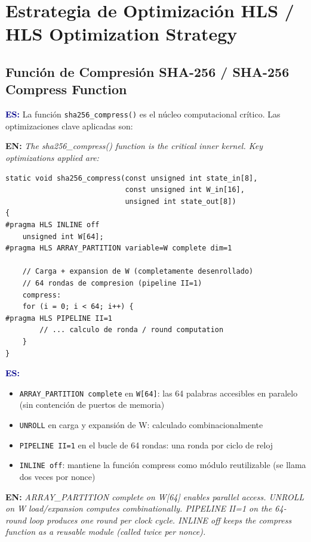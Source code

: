 \documentclass[12pt,a4paper]{article}
\newcommand{\bsection}[2]{%
    \section{#1 \textnormal{\normalsize\color{accentblue}/ #2}}%
}
\newcommand{\bsubsection}[2]{%
    \subsection{#1 \textnormal{\small\color{accentblue}/ #2}}%
}
\newenvironment{bilingual}{%
    \par\medskip
}{%
    \par\medskip
}
\newcommand{\espara}[1]{\noindent\textcolor{darkblue}{\textbf{ES:}} #1\par\smallskip}
\newcommand{\enpara}[1]{\noindent\textcolor{accentblue}{\textbf{EN:}} \textit{#1}\par\smallskip}
\begin{document}
\bsection{Estrategia de Optimizaci\'on HLS}{HLS Optimization Strategy}

\bsubsection{Funci\'on de Compresi\'on SHA-256}{SHA-256 Compress Function}

\begin{bilingual}
\espara{%
La funci\'on \texttt{sha256\_compress()} es el n\'ucleo computacional cr\'itico.
Las optimizaciones clave aplicadas son:}

\enpara{%
The sha256\_compress() function is the critical inner kernel.
Key optimizations applied are:}
\end{bilingual}

\begin{lstlisting}[style=cstyle]
static void sha256_compress(const unsigned int state_in[8],
                            const unsigned int W_in[16],
                            unsigned int state_out[8])
{
#pragma HLS INLINE off
    unsigned int W[64];
#pragma HLS ARRAY_PARTITION variable=W complete dim=1

    // Carga + expansion de W (completamente desenrollado)
    // 64 rondas de compresion (pipeline II=1)
    compress:
    for (i = 0; i < 64; i++) {
#pragma HLS PIPELINE II=1
        // ... calculo de ronda / round computation
    }
}
\end{lstlisting}

\begin{bilingual}
\espara{%
\begin{itemize}[leftmargin=2em]
    \item \texttt{ARRAY\_PARTITION complete} en \texttt{W[64]}: las 64 palabras accesibles en paralelo (sin contenci\'on de puertos de memoria)
    \item \texttt{UNROLL} en carga y expansi\'on de W: calculado combinacionalmente
    \item \texttt{PIPELINE II=1} en el bucle de 64 rondas: una ronda por ciclo de reloj
    \item \texttt{INLINE off}: mantiene la funci\'on compress como m\'odulo reutilizable (se llama dos veces por nonce)
\end{itemize}}

\enpara{%
ARRAY\_PARTITION complete on W[64] enables parallel access.
UNROLL on W load/expansion computes combinationally.
PIPELINE II=1 on the 64-round loop produces one round per clock cycle.
INLINE off keeps the compress function as a reusable module (called twice per nonce).}
\end{bilingual}
\end{document}
